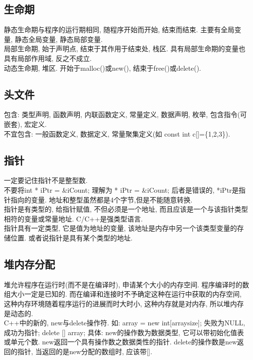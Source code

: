 \documentclass[a4paper,10pt,english]{article}
\begin{document}
\subsection {生命期}
静态生命期与程序的运行期相同, 随程序开始而开始, 结束而结束. 主要有全局变量, 静态全局变量, 静态局部变量.\\
局部生命期, 始于声明点, 结束于其作用于结束处, 栈区. 具有局部生命期的变量也具有局部作用域, 反之不成立. \\
动态生命期, 堆区. 开始于malloc()或new(), 结束于free()或delete().

\subsection {头文件}
包含: 类型声明, 函数声明, 内联函数定义, 常量定义, 数据声明, 枚举, 包含指令(可嵌套), 宏定义. \\
不宜包含: 一般函数定义, 数据定义, 常量聚集定义(如 const int c[]=\{1,2,3\}).

\subsection {指针}
一定要记住指针不是整型数. \\
不要将int * iPtr = \&iCount; 理解为 * iPtr = \&iCount; 后者是错误的, *iPtr是指针指向的变量. 地址和整型虽然都是4个字节,但是不能随意转换.\\
指针是有类型的, 给指针赋值, 不但必须是一个地址, 而且应该是一个与该指针类型相符的变量或常量地址. C/C++是强类型语言. \\
指针具有一定类型, 它是值为地址的变量, 该地址是内存中另一个该类型变量的存储位置. 或者说指针是具有某个类型的地址. \\

\subsection {堆内存分配}
堆允许程序在运行时(而不是在编译时), 申请某个大小的内存空间. 程序编译时的数组大小一定是已知的. 而在编译和连接时不予确定这种在运行中获取的内存空间, 这种内存环境随着程序运行的进展而时大时小, 这种内存就是对内存, 所以堆内存是动态的. \\
C++中的新的, new与delete操作符. 如: array = new int[arraysize]; 失败为NULL, 成功为指针; delete [] array; 具体: new的操作数为数据类型, 它可以带初始化值表或单元个数. new返回一个具有操作数之数据类性的指针. delete的操作数是new返回的指针, 当返回的是new分配的数组时, 应该带[].
\end{document}
